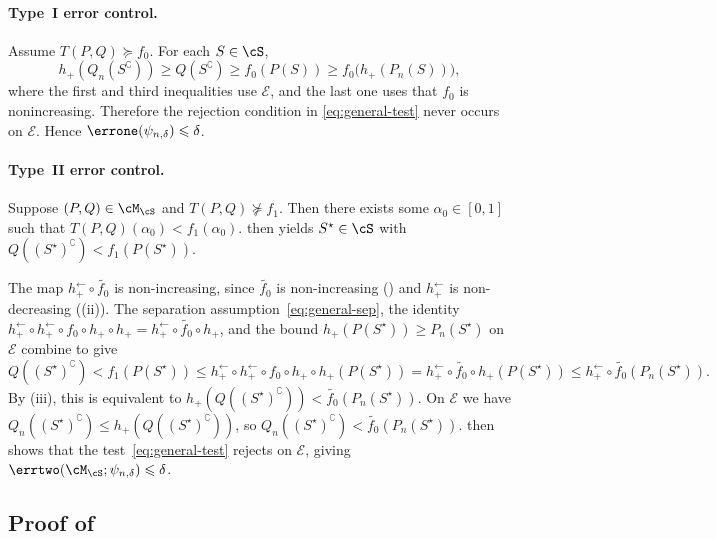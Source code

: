 \documentclass[english]{article}
\theoremstyle{plain}
\theoremstyle{definition}
\newcommand{\hinv}{h_+^{\leftarrow}}
\newcommand{\Toff}[2]{T(#1,#2)}
\newcommand{\hupup}{h_+\mathbin{\circ}h_+}                 %
\newcommand{\hinvinv}{h_+^{\leftarrow}\mathbin{\circ}h_+^{\leftarrow}}  %
\newcommand{\fnull}{f_0}
\newcommand{\falt}{f_1}
\newcommand{\hup}{h_+}                             %
\begin{document}
\paragraph{Type~I error control.}
Assume \(\Toff{P}{Q}\succeq \fnull\). For each \(S\in\cS\),
\[
\hup(Q_n(S^\complement))
\geqslant Q(S^\complement)
\geqslant \fnull(P(S))
\geqslant \fnull\bigl(\hup(P_n(S))\bigr),
\]
where the first and third inequalities use \(\mathcal E\), and the last one uses
that \(\fnull\) is nonincreasing. Therefore the rejection condition in
\eqref{eq:general-test} never occurs on \(\mathcal E\). Hence
$\errone(\psi_{n,\delta})\leqslant \delta$.

\paragraph{Type~II error control.}
Suppose $(P,Q)\in\cM_{\cS}$ and $\Toff{P}{Q}\nsucceq\falt$. 
Then there exists some $\alpha_0 \in [0,1]$ such that $\Toff{P}{Q}(\alpha_0) < \falt(\alpha_0)$.
 then yields $S^\star\in\cS$ with $Q((S^\star)^\complement)<\falt(P(S^\star))$.



The map $\hinv\circ\widetilde{\fnull}$ is non-increasing, since $\widetilde{\fnull}$ is non-increasing () and $\hinv$ is non-decreasing ((ii)).  
The separation assumption~\eqref{eq:general-sep}, the identity $\hinvinv\circ\fnull\circ\hupup=\hinv\circ\widetilde{\fnull}\circ\hup$, and the bound $\hup(P(S^\star))\geqslant P_n(S^\star)$ on $\mathcal E$ combine to give
\[
Q((S^\star)^\complement)
<\falt(P(S^\star))
\leqslant \hinvinv\circ\fnull\circ\hupup(P(S^\star))
=\hinv\circ\widetilde{\fnull}\circ\hup(P(S^\star))
\leqslant \hinv\circ\widetilde{\fnull}(P_n(S^\star)).
\]
By (iii), this is equivalent to $\hup(Q((S^\star)^\complement))<\widetilde{\fnull}(P_n(S^\star))$. On $\mathcal E$ we have $Q_n((S^\star)^\complement)\leqslant\hup(Q((S^\star)^\complement))$, so $Q_n((S^\star)^\complement)<\widetilde{\fnull}(P_n(S^\star))$.  then shows that the test~\eqref{eq:general-test} rejects on $\mathcal E$, giving $\errtwo(\cM_{\cS};\psi_{n,\delta})\leqslant\delta$.


\subsection{Proof of }\label{sec:proof-confidence-bands}
\end{document}

